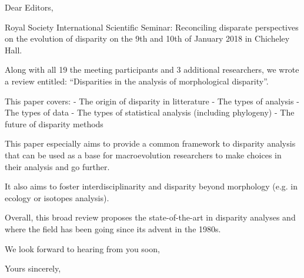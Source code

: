 \documentclass[11pt]{letter}
\begin{document}
\begin{letter}{}
\opening{Dear Editors,}

Royal Society International Scientific Seminar: Reconciling disparate perspectives on the evolution of disparity on the 9th and 10th of January 2018 in Chicheley Hall.

Along with all 19 the meeting participants and 3 additional researchers, we wrote a review entitled: ``Disparities in the analysis of morphological disparity''.

This paper covers:
- The origin of disparity in litterature
- The types of analysis
- The types of data
- The types of statistical analysis (including phylogeny)
- The future of disparity methods

This paper especially aims to provide a common framework to disparity analysis that can be used as a base for macroevolution researchers to make choices in their analysis and go further.

It also aims to foster interdisciplinarity and disparity beyond morphology (e.g. in ecology or isotopes analysis).

Overall, this broad review proposes the state-of-the-art in disparity analyses and where the field has been going since its advent in the 1980s.







We look forward to hearing from you soon,

\closing{Yours sincerely,}


\end{letter}
\end{document}

